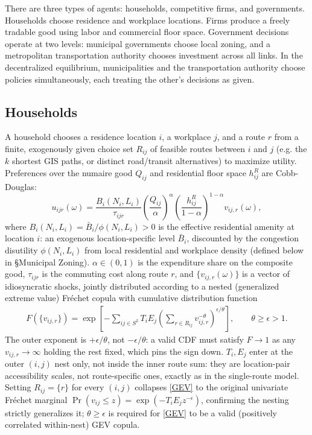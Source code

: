 \documentclass[12pt, a4paper]{article}
\theoremstyle{definition}
\theoremstyle{remark}
\begin{document}
There are three types of agents: households, competitive firms, and governments. Households choose residence and workplace locations. Firms produce a freely tradable good using labor and commercial floor space. Government decisions operate at two levels: municipal governments choose local zoning, and a metropolitan transportation authority chooses investment across all links. In the decentralized equilibrium, municipalities and the transportation authority choose policies simultaneously, each treating the other's decisions as given.

\subsection{Households}

A household chooses a residence location $i$, a workplace $j$, and a route $r$ from a finite, exogenously given choice set $R_{ij}$ of feasible routes between $i$ and $j$ (e.g. the $k$ shortest GIS paths, or distinct road/transit alternatives) to maximize utility. Preferences over the numaire good $Q_{ij}$ and residential floor space $h_{ij}^R$ are Cobb-Douglas:
\[
u_{ijr}(\omega) = \frac{B_i(N_i,L_i)}{\tau_{ijr}}
\left(\frac{Q_{ij}}{\alpha}\right)^{\!\alpha}
\left(\frac{h_{ij}^R}{1-\alpha}\right)^{\!1-\alpha}
v_{ij,r}(\omega),
\]
where $B_i(N_i,L_i) = \bar B_i/\phi(N_i,L_i) > 0$ is the effective residential amenity at location $i$: an exogenous location-specific level $\bar B_i$, discounted by the congestion disutility $\phi(N_i,L_i)$ from local residential and workplace density (defined below in \S Municipal Zoning). $\alpha \in (0,1)$ is the expenditure share on the composite good, $\tau_{ijr}$ is the commuting cost along route $r$, and $\{v_{ij,r}(\omega)\}$ is a vector of idiosyncratic shocks, jointly distributed according to a nested (generalized extreme value) Fréchet copula with cumulative distribution function
\begin{align}
    \label{GEV}
    F(\{v_{ij,r}\}) = \exp\!\left[-\sum_{ij \in S^{2}} T_iE_j\left(\sum_{r\in R_{ij}}v_{ij,r}^{-\theta}\right)^{\!\epsilon/\theta}\right], \qquad \theta \geq \epsilon > 1.
\end{align}
The outer exponent is $+\epsilon/\theta$, not $-\epsilon/\theta$: a valid CDF must satisfy $F\to1$ as any $v_{ij,r}\to\infty$ holding the rest fixed, which pins the sign down. $T_i,E_j$ enter at the outer $(i,j)$ nest only, not inside the inner route sum: they are location-pair accessibility scales, not route-specific ones, exactly as in the single-route model. Setting $R_{ij}=\{r\}$ for every $(i,j)$ collapses \eqref{GEV} to the original univariate Fréchet marginal $\Pr(v_{ij}\leq z)=\exp(-T_iE_jz^{-\epsilon})$, confirming the nesting strictly generalizes it; $\theta\geq\epsilon$ is required for \eqref{GEV} to be a valid (positively correlated within-nest) GEV copula.
\end{document}
